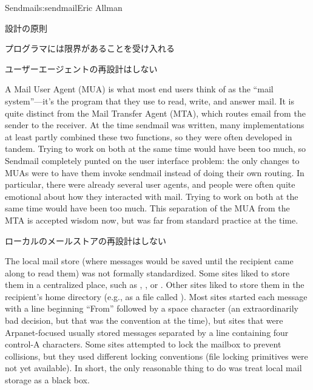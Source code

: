 \begin{aosachapter}{Sendmail}{s:sendmail}{Eric Allman}
\begin{aosasect1}{設計の原則}
\begin{aosasect2}{プログラマには限界があることを受け入れる}
\end{aosasect2}

\begin{aosasect2}{ユーザーエージェントの再設計はしない}

A Mail User Agent (MUA) is what most end users think of as the ``mail
system''---it's the program that they use to read, write, and answer
mail. It is quite distinct from the Mail Transfer Agent (MTA), which
routes email from the sender to the receiver. At the time sendmail was
written, many implementations at least partly combined these two
functions, so they were often developed in tandem. Trying to work on
both at the same time would have been too much, so Sendmail completely
punted on the user interface problem: the only changes to MUAs were to
have them invoke sendmail instead of doing their own routing. In
particular, there were already several user agents, and people were
often quite emotional about how they interacted with mail.
Trying to work on both at the same time would have been too much.
This
separation of the MUA from the MTA is accepted wisdom now, but was far
from standard practice at the time.

\end{aosasect2}

\begin{aosasect2}{ローカルのメールストアの再設計はしない}

The local mail store (where messages would be saved until the
recipient came along to read them) was not formally standardized. Some sites
liked to store them in a centralized place, such as ,
, or . Other sites liked to
store them in the recipient's home directory (e.g., as a file called
). Most sites started each message with a line beginning
``From'' followed by a space character (an extraordinarily bad
decision, but that was the convention at the time), but sites that
were Arpanet-focused usually stored messages separated by a line
containing four control-A characters. Some sites attempted to lock the
mailbox to prevent collisions, but they used different locking
conventions (file locking primitives were not yet available). In
short, the only reasonable thing to do was treat local mail storage as
a black box.


\end{aosasect2}
\end{aosasect1}
\end{aosachapter}
